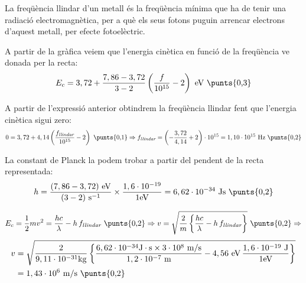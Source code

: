 \begin{solapartat}
La freqüència llindar d'un metall és la freqüència mínima que ha de tenir una radiació electromagnètica, per a què els seus fotons puguin arrencar electrons d'aquest metall, per efecte fotoelèctric. 

A partir de la gràfica veiem que l'energia cinètica en funció de la freqüència ve donada per la recta:
\[ E_c = 3,72 + \frac{7,86 - 3,72}{3 - 2}\left(\frac{f}{10^{15}} - 2\right)\ \mathrm{eV}\ \text{\punts{0,3}} \]

A partir de l'expressió anterior obtindrem la freqüència llindar fent que l'energia cinètica sigui zero: 
\[ 0 = 3,72 + 4,14\left(\frac{f_\textit{llindar}}{10^{15}} - 2\right)\ \text{\punts{0,1}} \Rightarrow f_\textit{llindar} = \left(-\frac{3,72}{4,14} + 2\right)\cdot 10^{15} = 1,10\cdot 10^{15}\ \mathrm{Hz}\ \text{\punts{0,2}} \]
\end{solapartat}

\begin{solapartat}
La constant de Planck la podem trobar a partir del pendent de la recta representada: 
\[ h = \frac{(7,86 - 3,72)\ \mathrm{eV}}{(3 - 2)\ \mathrm{s^{-1}}}\times\frac{1,6\cdot 10^{-19}}{1\mathrm{eV}} = 6,62\cdot 10^{-34}\ \mathrm{Js}\ \text{\punts{0,2}} \]

\[ E_c = \frac{1}{2}mv^2 = \frac{hc}{\lambda} - h\,f_\textit{llindar}\ \text{\punts{0,2}} \Rightarrow v = \sqrt{\frac{2}{m}\left\{\frac{hc}{\lambda} - h\,f_\textit{llindar}\right\}}\ \text{\punts{0,2}} \Rightarrow \]
\begin{align*}
v &= \sqrt{\frac{2}{9,11\cdot 10^{-31}\mathrm{kg}}\left\{\frac{6,62\cdot 10^{-34}\mathrm{J\cdot s}\times 3\cdot 10^{8}\ \mathrm{m/s}}{1,2\cdot 10^{-7}\ \mathrm{m}} - 4,56\ \mathrm{eV}\,\frac{1,6\cdot 10^{-19}\ \mathrm{J}}{1\mathrm{eV}}\right\}}\\
&= 1,43\cdot 10^{6}\ \mathrm{m/s}\ \text{\punts{0,2}}
\end{align*}
\end{solapartat}
